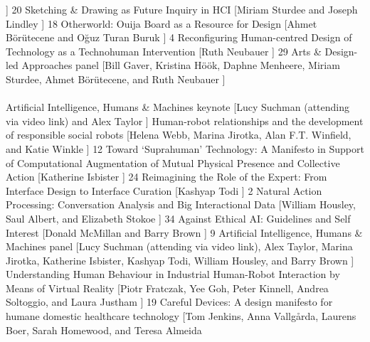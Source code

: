 \begin{sessions}
]%
    { 20
}
    {Sketching \& Drawing as Future Inquiry in HCI%
}%
    [Miriam Sturdee and Joseph Lindley%
]%
    { 18
}
    {Otherworld: Ouija Board as a Resource for Design%
}%
    [Ahmet Börütecene and Oğuz Turan Buruk%
]%
    { 4
}
    {Reconfiguring Human-centred Design of Technology as a Technohuman Intervention%
}%
    [Ruth Neubauer%
]%
    { 29
}
    {Arts \& Design-led Approaches  panel%
}%
    [Bill Gaver, Kristina Höök, Daphne Menheere, Miriam Sturdee, Ahmet Börütecene, and Ruth Neubauer%
]%
    { 
}
 \\
 \\
    {Artificial Intelligence, Humans \& Machines keynote%
}%
    [Lucy Suchman (attending via video link) and Alex Taylor%
]%
    { 
}
    {Human-robot relationships and the development of responsible social robots%
}%
    [Helena Webb, Marina Jirotka, Alan F.T. Winfield, and Katie Winkle%
]%
    { 12
}
    {Toward ‘Suprahuman’ Technology: A Manifesto in Support of Computational Augmentation of Mutual Physical Presence and Collective Action%
}%
    [Katherine Isbister%
]%
    { 24
}
    {Reimagining the Role of the Expert: From Interface Design to Interface Curation%
}%
    [Kashyap Todi%
]%
    { 2
}
    {Natural Action Processing: Conversation Analysis and Big Interactional Data%
}%
    [William Housley, Saul Albert, and Elizabeth Stokoe%
]%
    { 34
}
    {Against Ethical AI: Guidelines and Self Interest%
}%
    [Donald McMillan and Barry Brown%
]%
    { 9
}
    {Artificial Intelligence, Humans \& Machines panel%
}%
    [Lucy Suchman (attending via video link), Alex Taylor, Marina Jirotka, Katherine Isbister, Kashyap Todi, William Housley, and Barry Brown%
]%
    { 
}
 \\
    {Understanding Human Behaviour in Industrial Human-Robot Interaction by Means of Virtual Reality%
}%
    [Piotr Fratczak, Yee Goh, Peter Kinnell, Andrea Soltoggio, and Laura Justham%
]%
    { 19
}
    {Careful Devices: A design manifesto for humane domestic healthcare technology%
}%
    [Tom Jenkins, Anna Vallgårda, Laurens Boer, Sarah Homewood, and Teresa Almeida%

\end{sessions}
